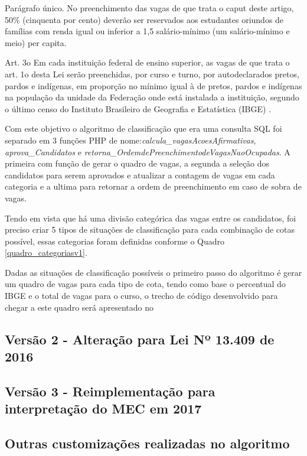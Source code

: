 \begin{citacao}
Parágrafo único.  No preenchimento das vagas de que trata o caput deste artigo, 50\% (cinquenta por cento) deverão ser reservados aos estudantes oriundos de famílias com renda igual ou inferior a 1,5 salário-mínimo (um salário-mínimo e meio) per capita.

Art. 3o  Em cada instituição federal de ensino superior, as vagas de que trata o art. 1o desta Lei serão preenchidas, por curso e turno, por autodeclarados pretos, pardos e indígenas, em proporção no mínimo igual à de pretos, pardos e indígenas na população da unidade da Federação onde está instalada a instituição, segundo o último censo do Instituto Brasileiro de Geografia e Estatística (IBGE) \cite{leicotas}.
\end{citacao}

Com este objetivo o algoritmo de classificação que era uma consulta SQL foi separado em 3 funções PHP de nome:\textit{calcula\_vagasAcoesAfirmativas}, \textit{aprova\_Candidatos} e \textit{retorna\_OrdemdePreenchimentodeVagasNaoOcupadas}.  A primeira com função de gerar o quadro de vagas, a segunda a seleção dos candidatos para serem aprovados e atualizar a contagem de vagas em cada categoria e a ultima para retornar a ordem de preenchimento em caso de sobra de vagas.

Tendo em vista que há uma divisão categórica das vagas entre os candidatos, foi preciso criar 5 tipos de situações de classificação para cada combinação de cotas possível, essas categorias foram definidas conforme o Quadro \ref{quadro_categoriasv1}.



\newpage
Dadas as situações de classificação possíveis o primeiro passo do algoritmo é gerar um quadro de vagas para cada tipo de cota, tendo como base o percentual do \gls{IBGE} e o total de vagas para o curso, o trecho de código desenvolvido para chegar a este quadro será apresentado no




\subsection{Versão 2 - Alteração para Lei Nº 13.409 de 2016 }
\label{versao2}

\subsection{Versão 3 - Reimplementação para interpretação do MEC em 2017 }
\label{versao3}

\subsection{Outras customizações realizadas no algoritmo}
\label{outrasVersoes}